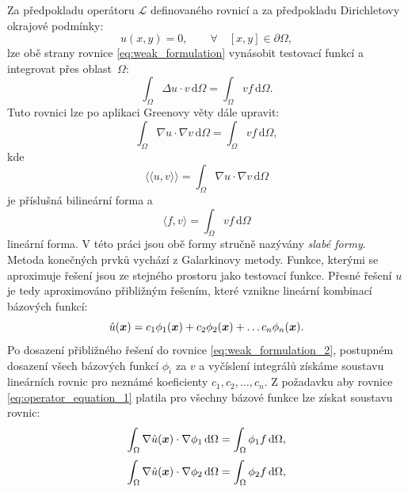 \documentclass[12pt,a4paper,oneside]{article}
\numberwithin{equation}{section} %
\numberwithin{figure}{section} %
\numberwithin{table}{section} %
\newcommand{\dif}{\,\mathrm{d}} %
\renewcommand{\vec}[1]{\mbox{\boldmath$#1$}} %
\begin{document}
Za předpokladu operátoru $\mathcal{L}$ definovaného rovnicí a za předpokladu Dirichletovy okrajové podmínky:
\begin{equation}
u(x,y) = 0, \qquad \forall \quad [x, y] \in \partial\Omega,  
\label{eq:operator_equation_1}
\end{equation}
lze obě strany rovnice \ref{eq:weak_formulation} vynásobit testovací funkcí a integrovat přes oblast~$\Omega$:
\begin{equation}
\int_\Omega \Delta u \cdot v \dif \Omega =  
\int_\Omega v f \dif \Omega.
\label{eq:weak_formulation_1}
\end{equation}
Tuto rovnici lze po aplikaci Greenovy věty dále upravit:
\begin{equation}
\int_\Omega \nabla u \cdot \nabla v \dif \Omega = \int_\Omega v f \dif \Omega,
\label{eq:weak_formulation_2}
\end{equation} 
kde 
\begin{equation}
\langle\langle u, v \rangle\rangle = \int_\Omega \nabla u \cdot \nabla v \dif \Omega
\end{equation}
je příslušná bilineární forma a  
\begin{equation}
\langle f,v \rangle = \int_\Omega v f \dif \Omega
\end{equation}
lineární forma. V této práci jsou obě formy stručně nazývány \emph{slabé formy}.
Metoda konečných prvků vychází z Galarkinovy metody. Funkce, kterými se aproximuje řešení jsou ze stejného prostoru jako testovací funkce. 
Přesné řešení $u$ je tedy aproximováno přibližným řešením, které vznikne lineární kombinací bázových funkcí:
\begin{equation}
\hat{u}(\vec{x}) = c_1 \phi_1(\vec{x}) + c_2 \phi_2(\vec{x}) +  \dots c_n \phi_n(\vec{x}).
\end{equation}
Po dosazení přibližného řešení do rovnice \ref{eq:weak_formulation_2},  postupném dosazení všech bázových funkcí $\phi_i$ za $v$ a  vyčíslení integrálů získáme soustavu lineárních rovnic pro neznámé koeficienty 
$c_1, c_2, \dots , c_n$. 
Z požadavku aby rovnice \ref{eq:operator_equation_1} platila pro všechny bázové funkce lze získat soustavu rovnic:
\begin{equation}
\int_\Omega \nabla \hat{u}(\vec{x}) \cdot \nabla \phi_1 \dif \Omega = \int_\Omega \phi_1 f \dif \Omega,
\end{equation}
\begin{displaymath}
\int_\Omega \nabla \hat{u}(\vec{x}) \cdot \nabla \phi_2 \dif \Omega = \int_\Omega \phi_2 f \dif \Omega,
\end{displaymath}
\end{document}
